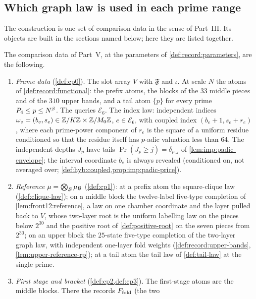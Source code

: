 \subsection{Which graph law is used in each prime range}\label{subsec:design-laws}

The construction is one set of comparison data in the sense of Part~III. Its
objects are built in the sections named below; here they are listed together.

\begin{definition}\label{def:construction}
The comparison data of Part~V, at the parameters of
\cref{def:record:parameters}, are the following.
\begin{enumerate}[label=(\alph*)]
\item \emph{Frame data} (\cref{def:cp0}). The slot array $V$ with $\mathfrak F$
 and $\iota$. At scale $N$ the atoms of \cref{def:record:functional}: the
 prefix atoms, the blocks of the $33$ middle pieces and of the $310$ upper
 bands, and a tail atom $\{p\}$ for every prime $P_4\le p\le N^{\beta}$. The
 queries $\mathcal E_6$. The index law: independent indices
 $\omega_e=(b_e,s_e)\in\mathbb Z/K\mathbb Z\times\mathbb Z/M_0\mathbb Z$, $e\in\mathcal E_6$, with
 coupled index $(b_e+1,s_e+r_e)$, where each prime-power component of
 $r_e$ is the square of a uniform residue conditioned so that the residue
 itself has $p$-adic valuation less than $64$. The independent depths $J_p$ have tails
 $\Pr(J_p\ge j)=\delta_{p,j}$ of \cref{lem:imp:padic-envelope}; the interval
 coordinate $b_e$ is always revealed (conditioned on, not averaged over;
 \cref{def:hyb:coupled,prop:imp:padic-price}).
\item \emph{Reference} $\mu=\bigotimes_{\mathcal B}\mu_{\mathcal B}$ (\cref{def:cp1}): at a
 prefix atom the square-clique law (\cref{def:clique-law}); on a middle block
 the twelve-label five-type completion of \cref{lem:front12:reference}, a law
 on one chamber coordinate and the layer pulled back to $V$, whose two-layer
 root is the uniform labelling law on the pieces below $2^{30}$ and the
 positive root of \cref{def:positive-root} on the seven pieces from $2^{30}$;
 on an upper block the $25$-state five-type completion of the two-layer graph
 law, with independent one-layer fold weights (\cref{def:record:upper-bands},
 \cref{lem:upper-reference-rp}); at a tail atom the tail law of
 \cref{def:tail-law} at the single prime.
\item \emph{First stage and bracket} (\cref{def:cp2,def:cp3}). The first-stage
 atoms are the middle blocks. There the records $F_{\rm fold}$ (the two

\end{enumerate}
\end{definition}
